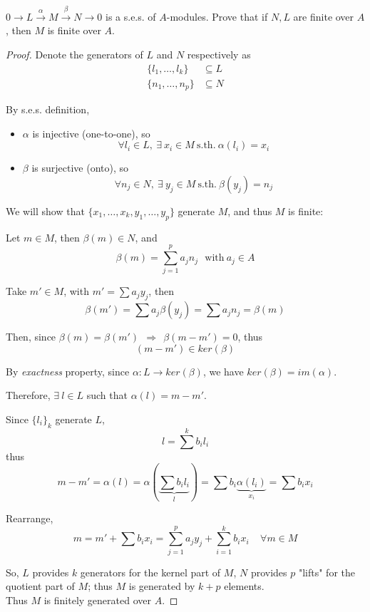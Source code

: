 \documentclass{article}
\theoremstyle{definition}
\newenvironment{ex}[1]
{\renewcommand\theinnerex{#1}\innerex}
{\endinnerex}
\begin{document}
\begin{ex}{R.2.9}
$0 \longrightarrow L \stackrel{\alpha}{\longrightarrow} M \stackrel{\beta}{\longrightarrow} N \longrightarrow 0$ is a s.e.s. of $A$-modules. Prove that if $N, L$ are finite over $A$, then $M$ is finite over $A$.
\end{ex}
\begin{proof}
  Denote the generators of $L$ and $N$ respectively as
  \begin{align*}
    \{l_1, \ldots, l_k \} &\subseteq L\\
    \{n_1, \ldots, n_p \} &\subseteq N
  \end{align*}

  By s.e.s. definition, 
  \begin{itemize}
    \item[-] $\alpha$ is injective (one-to-one), so
    $$\forall l_i \in L,~ \exists~ x_i \in M ~\text{s.th.}~ \alpha(l_i)=x_i$$

  \item[-] $\beta$ is surjective (onto), so
    $$\forall n_j \in N,~ \exists~ y_j \in M ~\text{s.th.}~ \beta(y_j)=n_j$$
\end{itemize}

  We will show that $\{x_1, \ldots, x_k, y_1, \ldots, y_p \}$ generate $M$, and thus $M$ is finite:

  Let $m \in M$, then $\beta(m) \in N$, and
  $$\beta(m) = \sum_{j=1}^p a_j n_j ~~~\text{with}~ a_j \in A$$

  Take $m' \in M$, with $m' = \sum a_j y_j$, then
  $$\beta(m') = \sum a_j \beta(y_j) = \sum a_j n_j = \beta(m)$$

  Then, since $\beta(m)=\beta(m')~~ \Longrightarrow~~ \beta(m-m')=0$, thus
  $$(m-m') \in ker(\beta)$$

  By \emph{exactness} property, since $\alpha: L \longrightarrow ker(\beta)$, we have $ker(\beta)=im(\alpha)$.

  Therefore, $\exists~ l \in L$ such that $\alpha(l)= m-m'$.

  Since $\{l_i\}_k$ generate $L$,
  $$l = \sum^k b_i l_i$$
  thus
  $$m-m' = \alpha(l) = \alpha(\underbrace{\sum b_i l_i}_{l}) = \sum b_i \underbrace{\alpha(l_i)}_{x_i} = \sum b_i x_i$$

  Rearrange,
  $$m = m' + \sum b_i x_i = \sum_{j=1}^p a_j y_j + \sum_{i=1}^k b_i x_i ~~~~~ \forall m \in M$$

  So, $L$ provides $k$ generators for the kernel part of $M$, $N$ provides $p$ "lifts" for the quotient part of $M$; thus $M$ is generated by $k+p$ elements.\\
  Thus $M$ is finitely generated over $A$.
\end{proof}
\end{document}
